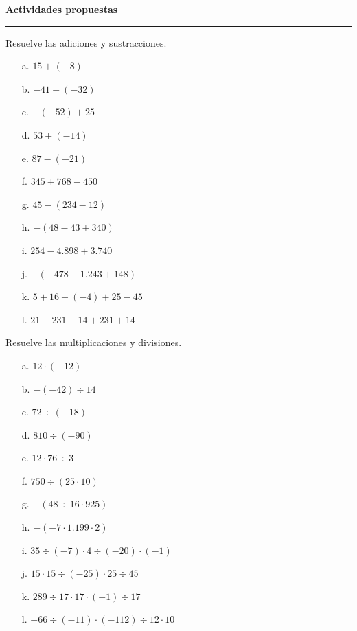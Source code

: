 \documentclass[spanish,letterpaper, 11pt, addpoints, answers]{exam}
\begin{document}
\parbox{6in}{
\textbf{Actividades propuestas}}
\vspace{0.15in}
\hrule 

\begin{questions}

\question Resuelve las adiciones y sustracciones.
\begin{multicols}{2}

\begin{itemize}
  \item[a.] $15+(-8)$
  \item[b.] $-41+(-32)$
  \item[c.] $-(-52)+25$
  \item[d.] $53+(-14)$
  \item[e.] $87-(-21)$
  \item[f.] $345+768-450$
  \item[g.] $45-(234-12)$
  \item[h.] $-(48-43+340)$
  \item[i.] $254-4.898+3.740$
  \item[j.] $-(-478-1.243+148)$
  \item[k.] $5+16+(-4)+25-45$
  \item[l.] $21-231-14+231+14$
\end{itemize}
\end{multicols}

\question Resuelve las multiplicaciones y divisiones.
\begin{multicols}{2}
  

  \begin{itemize}
    \item[a.] $12\cdot(-12)$
    \item[b.] $-(-42)\div 14$
    \item[c.] $72\div (-18)$
    \item[d.] $810\div (-90)$
    \item[e.] $12\cdot 76\div 3$
    \item[f.] $750\div(25\cdot 10)$
    \item[g.] $-(48\div 16\cdot 925)$
    \item[h.] $-(-7\cdot 1.199\cdot 2)$
    \item[i.] $35\div (-7)\cdot 4\div (-20)\cdot (-1)$
    \item[j.] $15\cdot 15\div (-25)\cdot 25\div 45$
    \item[k.] $289\div 17\cdot 17\cdot (-1)\div 17$
    \item[l.] $-66\div (-11)\cdot (-112)\div 12\cdot 10$
  \end{itemize}
\end{multicols}


\end{questions}
\end{document}
